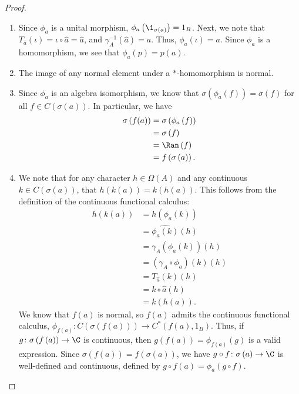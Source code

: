 \documentclass[10pt]{mypackage}
\begin{document}
\begin{proof}\hfill
  \begin{enumerate}[(1)]
    \item Since $\phi_a$ is a unital morphism, $\phi_a\left(\1_{\sigma\left(a\right)}\right) = 1_B$. Next, we note that $T_{\hat{a}}\left(\iota\right) = \iota\circ \hat{a} = \hat{a}$, and $\gamma_A^{-1}\left(\hat{a}\right) = a$. Thus, $\phi_a\left(\iota\right) = a$. Since $\phi_a$ is a homomorphism, we see that $\phi_a\left(p\right) = p(a)$.
    \item The image of any normal element under a $\ast$-homomorphism is normal.
    \item Since $\phi_a$ is an algebra isomorphism, we know that $\sigma\left(\phi_a\left(f\right)\right) = \sigma\left(f\right)$ for all $f\in C\left(\sigma\left(a\right)\right)$. In particular, we have
      \begin{align*}
        \sigma\left(f(a)\right) &= \sigma\left(\phi_a\left(f\right)\right)\\
                                &= \sigma\left(f\right)\\
                                &= \Ran\left(f\right)\\
                                &= f\left(\sigma\left(a\right)\right).
      \end{align*}
    \item We note that for any character $h\in \Omega\left(A\right)$ and any continuous $k\in C\left(\sigma\left(a\right)\right)$, that $h\left(k\left(a\right)\right) = k\left(h\left(a\right)\right)$. This follows from the definition of the continuous functional calculus:
      \begin{align*}
        h\left(k\left(a\right)\right) &= h\left(\phi_a\left(k\right)\right)\\
                                      &= \widehat{\phi_a\left(k\right)}\left(h\right)\\
                                      &= \gamma_A\left(\phi_a\left(k\right)\right)\left(h\right)\\
                                      &= \left(\gamma_A\circ \phi_a\right)\left(k\right)\left(h\right)\\
                                      &= T_{\hat{a}}\left(k\right)\left(h\right)\\
                                      &= k\circ \hat{a}\left(h\right)\\
                                      &= k\left(h\left(a\right)\right).
      \end{align*}
      We know that $f(a)$ is normal, so $f(a)$ admits the continuous functional calculus, $\phi_{f(a)}\colon C\left(\sigma\left(f\left(a\right)\right)\right) \rightarrow C^{\ast}\left(f(a),1_B\right)$. Thus, if $g\colon \sigma\left(f\left(a\right)\right)\rightarrow \C$ is continuous, then $g\left(f\left(a\right)\right) = \phi_{f(a)}(g)$ is a valid expression. Since $\sigma\left(f\left(a\right)\right) = f\left(\sigma\left(a\right)\right)$, we have $g\circ f\colon \sigma\left(a\right)\rightarrow \C$ is well-defined and continuous, defined by $g\circ f\left(a\right) = \phi_a\left(g\circ f\right)$.\newline


\end{enumerate}
\end{proof}
\end{document}
